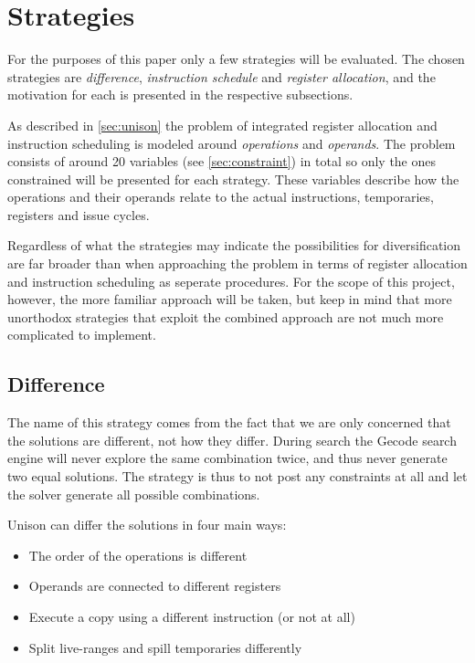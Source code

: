 \section{Strategies}

For the purposes of this paper only a few strategies will be evaluated. The chosen
strategies are \textit{difference}, \textit{instruction schedule} and
\textit{register allocation}, and the motivation for each is presented in the respective
subsections.

As described in \ref{sec:unison} the problem of integrated register allocation and
instruction scheduling is modeled around \textit{operations} and \textit{operands}. The
problem consists of around 20 variables (see \ref{sec:constraint}) in total so only the
ones constrained will be presented for each strategy. These variables describe how the
operations and their operands relate to the actual instructions, temporaries, registers
and issue cycles.

Regardless of what the strategies may indicate the possibilities for diversification are
far broader than when approaching the problem in terms of register allocation and instruction 
scheduling as seperate procedures. For the scope of this project, however, the more familiar
approach will be taken, but keep in mind that more unorthodox strategies that exploit the
combined approach are not much more complicated to implement.

\subsection{Difference}

The name of this strategy comes from the fact that we are only concerned that the solutions
are different, not how they differ. During search the Gecode search engine will never
explore the same combination twice, and thus never generate two equal solutions. The
strategy is thus to not post any constraints at all and let the solver generate all
possible combinations.

Unison can differ the solutions in four main ways:

\begin{itemize}
	\item The order of the operations is different
	\item Operands are connected to different registers
	\item Execute a copy using a different instruction (or not at all)
	\item Split live-ranges and spill temporaries differently
\end{itemize}

